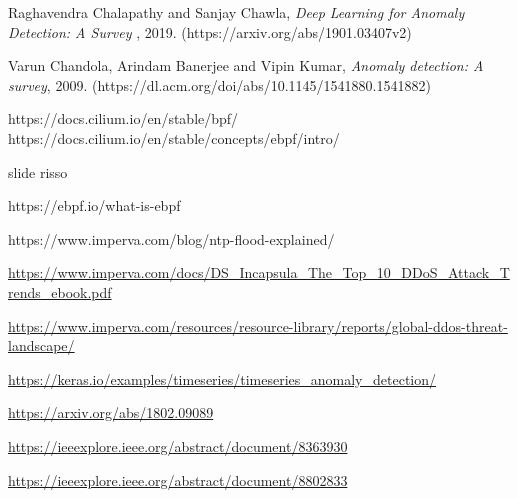 \begin{thebibliography}{9}
     Raghavendra Chalapathy and  Sanjay Chawla, {\em Deep Learning for Anomaly Detection: A Survey }, 2019. (https://arxiv.org/abs/1901.03407v2)
    
     Varun Chandola, Arindam Banerjee and Vipin Kumar, {\em Anomaly detection: A survey}, 2009. (https://dl.acm.org/doi/abs/10.1145/1541880.1541882)
    
     https://docs.cilium.io/en/stable/bpf/
     https://docs.cilium.io/en/stable/concepts/ebpf/intro/

     slide risso
     
     https://ebpf.io/what-is-ebpf

     https://www.imperva.com/blog/ntp-flood-explained/

     \url{https://www.imperva.com/docs/DS_Incapsula_The_Top_10_DDoS_Attack_Trends_ebook.pdf}
    
     \url{https://www.imperva.com/resources/resource-library/reports/global-ddos-threat-landscape/}

     \url{https://keras.io/examples/timeseries/timeseries_anomaly_detection/}

     \url{https://arxiv.org/abs/1802.09089}

     \url{https://ieeexplore.ieee.org/abstract/document/8363930}

     \url{https://ieeexplore.ieee.org/abstract/document/8802833}






\end{thebibliography}
